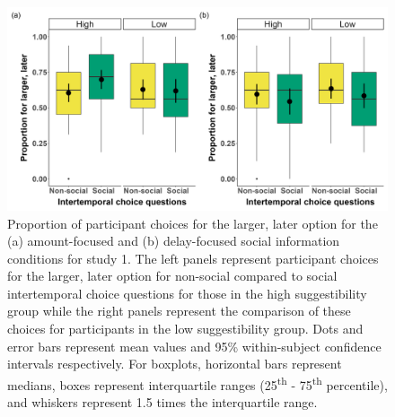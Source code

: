 \documentclass[
  doc,floatsintext]{apa6}
\begin{document}
\begin{figure}

{\centering \includegraphics[width=1\linewidth]{figures/suggestibility_itc_1} 

}

\caption{Proportion of participant choices for the larger, later option for the (a) amount-focused and (b) delay-focused social information conditions for study 1. The left panels represent participant choices for the larger, later option for non-social compared to social intertemporal choice questions for those in the high suggestibility group while the right panels represent the comparison of these choices for participants in the low suggestibility group. Dots and error bars represent mean values and 95\% within-subject confidence intervals respectively. For boxplots, horizontal bars represent medians, boxes represent interquartile ranges (25\textsuperscript{th} - 75\textsuperscript{th} percentile), and whiskers represent 1.5 times the interquartile range.}\label{fig:suggestibility1}
\end{figure}
\end{document}

